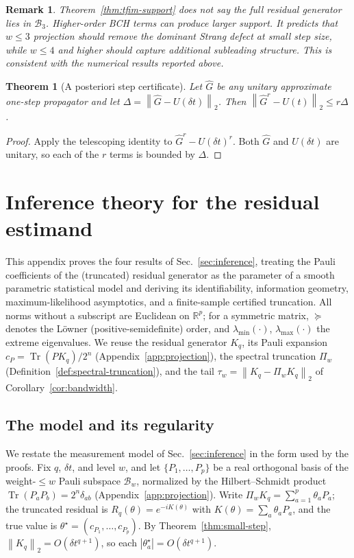 \documentclass[aps,prxquantum,reprint,superscriptaddress,nofootinbib,amsmath,amssymb]{revtex4-2}
\newcommand{\norm}[1]{\left\lVert #1 \right\rVert}
\newcommand{\abs}[1]{\left\lvert #1 \right\rvert}
\newcommand{\Tr}{\operatorname{Tr}}
\newcommand{\cB}{\mathcal{B}}
\newcommand{\dt}{\delta t}
\newtheorem{theorem}{Theorem}
\newtheorem{remark}{Remark}
\begin{document}
\begin{remark}
Theorem~\ref{thm:tfim-support} does not say the full residual generator lies in $\cB_3$. Higher-order BCH terms can produce larger support. It predicts that $w\leq3$ projection should remove the dominant Strang defect at small step size, while $w\leq4$ and higher should capture additional subleading structure. This is consistent with the numerical results reported above.
\end{remark}

\begin{theorem}[A posteriori step certificate]
\label{thm:posteriori}
Let $\widehat G$ be any unitary approximate one-step propagator and let $\Delta=\norm{\widehat G-U(\dt)}_2$. Then $\norm{\widehat G^r-U(t)}_2\leq r\Delta$.
\end{theorem}

\begin{proof}
Apply the telescoping identity to $\widehat G^r-U(\dt)^r$. Both $\widehat G$ and $U(\dt)$ are unitary, so each of the $r$ terms is bounded by $\Delta$.
\end{proof}

\section{Inference theory for the residual estimand}
\label{app:inference}

This appendix proves the four results of Sec.~\ref{sec:inference}, treating the Pauli coefficients of the (truncated) residual generator as the parameter of a smooth parametric statistical model and deriving its identifiability, information geometry, maximum-likelihood asymptotics, and a finite-sample certified truncation. All norms without a subscript are Euclidean on $\mathbb{R}^p$; for a symmetric matrix, $\succeq$ denotes the L\"owner (positive-semidefinite) order, and $\lambda_{\min}(\cdot)$, $\lambda_{\max}(\cdot)$ the extreme eigenvalues. We reuse the residual generator $K_q$, its Pauli expansion $c_P=\Tr(PK_q)/2^n$ (Appendix~\ref{app:projection}), the spectral truncation $\Pi_w$ (Definition~\ref{def:spectral-truncation}), and the tail $\tau_w=\norm{K_q-\Pi_wK_q}_2$ of Corollary~\ref{cor:bandwidth}.

\subsection{The model and its regularity}
\label{app:inference-model}

We restate the measurement model of Sec.~\ref{sec:inference} in the form used by the proofs. Fix $q$, $\dt$, and level $w$, and let $\{P_1,\dots,P_p\}$ be a real orthogonal basis of the weight-$\leq w$ Pauli subspace $\cB_w$, normalized by the Hilbert--Schmidt product $\Tr(P_aP_b)=2^n\delta_{ab}$ (Appendix~\ref{app:projection}). Write $\Pi_wK_q=\sum_{a=1}^{p}\theta_aP_a$; the truncated residual is $R_q(\theta)=e^{-iK(\theta)}$ with $K(\theta)=\sum_a\theta_aP_a$, and the true value is $\theta^\star=(c_{P_1},\dots,c_{P_p})$. By Theorem~\ref{thm:small-step}, $\norm{K_q}_2=O(\dt^{q+1})$, so each $\abs{\theta_a^\star}=O(\dt^{q+1})$.
\end{document}
